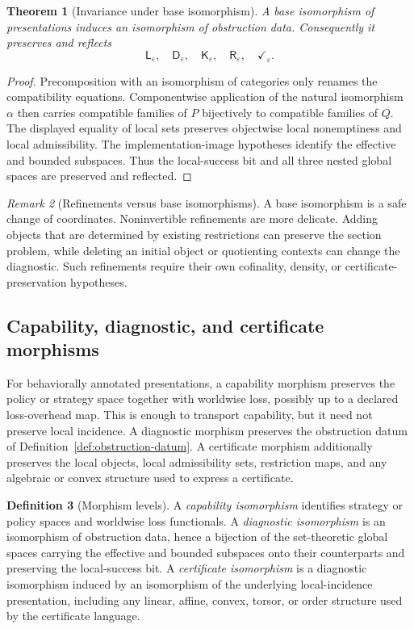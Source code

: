 \documentclass[11pt]{article}
\theoremstyle{plain}
\newtheorem{theorem}{Theorem}[section]
\theoremstyle{definition}
\newtheorem{definition}[theorem]{Definition}
\theoremstyle{remark}
\newtheorem{remark}[theorem]{Remark}
\newcommand{\eps}{\varepsilon}
\begin{document}
\begin{theorem}[Invariance under base isomorphism]
\label{thm:base-isomorphism-invariance}
A base isomorphism of presentations induces an isomorphism of obstruction data.
Consequently it preserves and reflects
\[
\mathsf L_\eps,\quad \mathsf D_\eps,\quad \mathsf K_\eps,\quad
\mathsf R_\eps,\quad \checkmark_\eps .
\]
\end{theorem}

\begin{proof}
Precomposition with an isomorphism of categories only renames the compatibility
equations. Componentwise application of the natural isomorphism $\alpha$ then
carries compatible families of $P$ bijectively to compatible families of $Q$.
The displayed equality of local sets preserves objectwise local nonemptiness and
local admissibility. The implementation-image hypotheses identify the effective
and bounded subspaces. Thus the local-success bit and all three nested global
spaces are preserved and reflected.
\end{proof}

\begin{remark}[Refinements versus base isomorphisms]
A base isomorphism is a safe change of coordinates. Noninvertible refinements are
more delicate. Adding objects that are determined by existing restrictions can
preserve the section problem, while deleting an initial object or quotienting
contexts can change the diagnostic. Such refinements require their own
cofinality, density, or certificate-preservation hypotheses.
\end{remark}

\subsection{Capability, diagnostic, and certificate morphisms}

For behaviorally annotated presentations, a capability morphism preserves the
policy or strategy space together with worldwise loss, possibly up to a declared
loss-overhead map. This is enough to transport capability, but it need not
preserve local incidence. A diagnostic morphism preserves the obstruction datum
of Definition~\ref{def:obstruction-datum}. A certificate morphism additionally
preserves the local objects, local admissibility sets, restriction maps, and any
algebraic or convex structure used to express a certificate.

\begin{definition}[Morphism levels]
\label{def:morphism-levels}
A \emph{capability isomorphism} identifies strategy or policy spaces and
worldwise loss functionals. A \emph{diagnostic isomorphism} is an isomorphism of
obstruction data, hence a bijection of the set-theoretic global spaces carrying
the effective and bounded subspaces onto their counterparts and preserving the
local-success bit. A \emph{certificate isomorphism} is a diagnostic isomorphism
induced by an isomorphism of the underlying local-incidence presentation,
including any linear, affine, convex, torsor, or order structure used by the
certificate language.
\end{definition}
\end{document}
